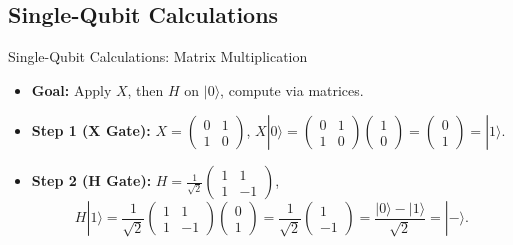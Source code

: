 \documentclass{beamer}
\begin{document}
\subsection{Single-Qubit Calculations}
\begin{frame}[fragile]{Single-Qubit Calculations: Matrix Multiplication}
    \begin{itemize}
        \item \textbf{Goal:} Apply $X$, then $H$ on $|0\rangle$, compute via matrices.
        \item \textbf{Step 1 (X Gate):} $X = \begin{pmatrix} 0 & 1 \\ 1 & 0 \end{pmatrix}$, $X |0\rangle = \begin{pmatrix} 0 & 1 \\ 1 & 0 \end{pmatrix} \begin{pmatrix} 1 \\ 0 \end{pmatrix} = \begin{pmatrix} 0 \\ 1 \end{pmatrix} = |1\rangle$.
        \item \textbf{Step 2 (H Gate):} $H = \frac{1}{\sqrt{2}} \begin{pmatrix} 1 & 1 \\ 1 & -1 \end{pmatrix}$, 
        \[
        H |1\rangle = \frac{1}{\sqrt{2}} \begin{pmatrix} 1 & 1 \\ 1 & -1 \end{pmatrix} \begin{pmatrix} 0 \\ 1 \end{pmatrix} = \frac{1}{\sqrt{2}} \begin{pmatrix} 1 \\ -1 \end{pmatrix} = \frac{|0\rangle - |1\rangle}{\sqrt{2}} = |-\rangle.
        \]
    \end{itemize}
\end{frame}
\end{document}
